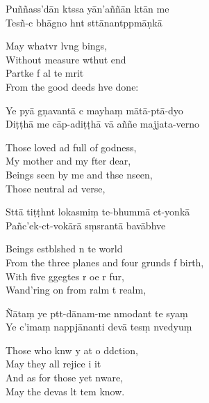 \begin{leader}
\end{leader}

Puññass'dān ktssa yān'aññān ktān me\\
Tesñ-c bhāgno hnt sttānantppmāṇkā

\begin{english}
  May whatvr lvng bings,\\
  Without measure wthut end\\
  Partke f al te mrit\\
  From the good deeds hve done:
\end{english}

Ye pyā gṇavantā c mayhaṃ mātā-ptā-dyo\\
Diṭṭhā me cāp-adiṭṭhā vā aññe majjata-verno

\begin{english}
  Those loved ad full of godness,\\
  My mother and my fter dear,\\
  Beings seen by me and thse nseen,\\
  Those neutral ad verse,
\end{english}

Sttā tiṭṭhnt lokasmiṃ te-bhummā ct-yonkā\\
Pañc'ek-ct-vokārā sṃsrantā bavābhve

\begin{english}
  Beings estblshed n te world\\
  From the three planes and four grunds f birth,\\
  With five ggegtes r oe r fur,\\
  Wand'ring on from ralm t realm,
\end{english}

Ñātaṃ ye ptt-dānam-me nmodant te syaṃ\\
Ye c'imaṃ nappjānanti devā tesṃ nvedyuṃ

\begin{english}
  Those who knw y at o ddction,\\
  May they all rejice i it\\
  And as for those yet nware,\\
  May the devas lt tem know.
\end{english}

